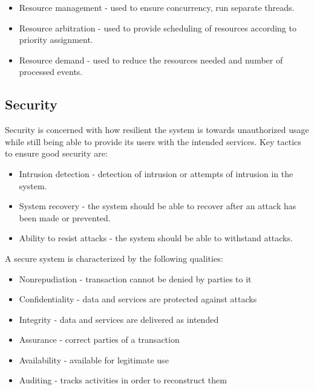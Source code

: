 \begin{itemize}
	\item Resource management - used to ensure concurrency, run separate threads.
	\item Resource arbitration - used to provide scheduling of resources according to priority assignment.
	\item Resource demand - used to reduce the resources needed and number of processed events.
\end{itemize}

\subsection{Security}
Security is concerned with how resilient the system is towards unauthorized usage while still being able to provide its users with the intended services. Key tactics to ensure good security are:

\begin{itemize}
	\item Intrusion detection - detection of intrusion or attempts of intrusion in the system.
	\item System recovery - the system should be able to recover after an attack has been made or prevented.
	\item Ability to resist attacks - the system should be able to withstand attacks. 
\end{itemize}

A secure system is characterized by the following qualities:

\begin{itemize}
	\item Nonrepudiation - transaction cannot be denied by parties to it
	\item Confidentiality - data and services are protected against attacks
	\item Integrity - data and services are delivered as intended
	\item Assurance - correct parties of a transaction
	\item Availability - available for legitimate use
	\item Auditing - tracks activities in order to reconstruct them
\end{itemize}
